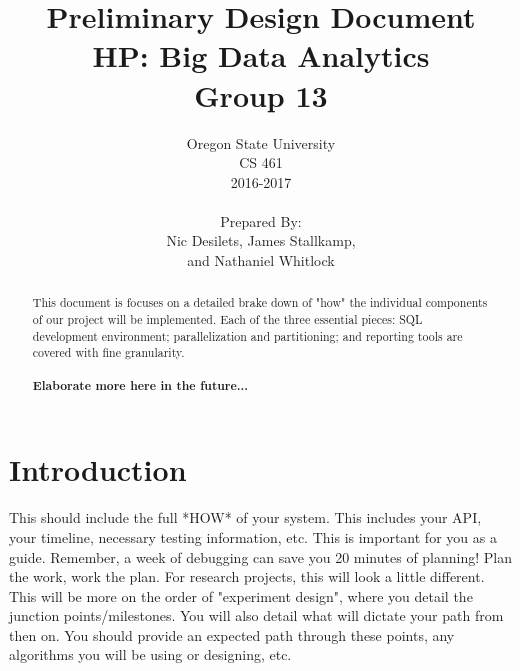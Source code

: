\documentclass[draftclsnofoot, onecolumn, compsoc, 10pt]{IEEEtran}
\title{\Huge Preliminary Design Document\\\large HP: Big Data Analytics\\Group 13}
\author{Oregon State University\\CS 461\\2016-2017\\\\Prepared By:\\Nic Desilets, James Stallkamp,\\and Nathaniel Whitlock}
\begin{document}
\begin{titlingpage}
    \maketitle 
    
    \vspace{1in}
    \begin{abstract}
		\noindent This document is focuses on a detailed brake down of "how" the individual components of our project will be implemented.
        Each of the three essential pieces: SQL development environment; parallelization and partitioning; and reporting tools are covered with fine granularity.\\\\
        \textbf{Elaborate more here in the future...}
        
    \end{abstract}
\end{titlingpage}

{\small\tableofcontents} %

\section{Introduction}
This should include the full *HOW* of your system.
This includes your API, your timeline, necessary testing information, etc.
This is important for you as a guide. Remember, a week of debugging can save you 20 minutes of planning! Plan the work, work the plan.
For research projects, this will look a little different. This will be more on the order of "experiment design", where you detail the junction points/milestones. You will also detail what will dictate your path from then on. You should provide an expected path through these points, any algorithms you will be using or designing, etc.

\end{document}
